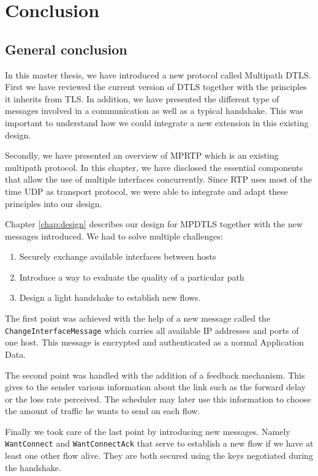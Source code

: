 \chapter{Conclusion}

\section{General conclusion}

In this master thesis, we have introduced a new protocol called Multipath DTLS. First we have reviewed the current version of DTLS together with the principles it inherits from TLS. In addition, we have presented the different type of messages involved in a communication as well as a typical handshake. This was important to understand how we could integrate a new extension in this existing design.

Secondly, we have presented an overview of MPRTP which is an existing multipath protocol. In this chapter, we have disclosed the essential components that allow the use of multiple interfaces concurrently. Since RTP uses most of the time UDP as transport protocol, we were able to integrate and adapt these principles into our design.

Chapter \ref{chap:design} describes our design for MPDTLS together with the new messages introduced. We had to solve multiple challenges:

\begin{enumerate}
\item Securely exchange available interfaces between hosts
\item Introduce a way to evaluate the quality of a particular path
\item Design a light handshake to establish new flows.
\end{enumerate}

The first point was achieved with the help of a new message called the \texttt{ChangeInterfaceMessage} which carries all available IP addresses and ports of one host. This message is encrypted and authenticated as a normal Application Data.

The second point was handled with the addition of a feedback mechanism. This gives to the sender various information about the link such as the forward delay or the loss rate perceived. The scheduler may later use this information to choose the amount of traffic he wants to send on each flow.

Finally we took care of the last point by introducing new messages. Namely \texttt{WantConnect} and \texttt{WantConnectAck} that serve to establish a new flow if we have at least one other flow alive. They are both secured using the keys negotiated during the handshake.

